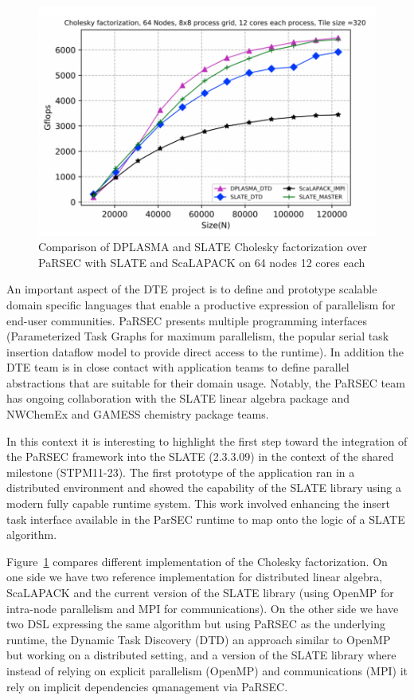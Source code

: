 \begin{figure}
\vspace*{-1em}\centering\includegraphics[scale=0.50]{projects/2.3.1-PMR/2.3.1.09-ParSEC/slate_updated_nacl.pdf}
  \caption{Comparison of DPLASMA and SLATE Cholesky factorization over PaRSEC with
           SLATE and ScaLAPACK on 64 nodes 12 cores each\label{fig:slate-parsec}}
\end{figure}
An important aspect of the DTE project is to define and prototype scalable
domain specific languages that enable a productive expression of parallelism for
end-user communities. PaRSEC presents multiple programming interfaces
(Parameterized Task Graphs for maximum parallelism, the popular serial task
insertion dataflow model to provide direct access to the runtime). In addition
the DTE team is in close contact with application teams to define parallel
abstractions that are suitable for their domain usage. Notably, the PaRSEC team
has ongoing collaboration with the SLATE linear algebra package and NWChemEx and
GAMESS chemistry package teams.

In this context it is interesting to highlight the first step toward
the integration of the PaRSEC framework into the SLATE (2.3.3.09) in
the context of the shared milestone (STPM11-23). The first prototype
of the application ran in a distributed environment and showed the
capability of the SLATE library using a modern fully capable runtime
system. This work involved enhancing the insert task interface
available in the ParSEC runtime to map onto the logic of a SLATE
algorithm.

Figure~\ref{fig:slate-parsec} compares different implementation of the
Cholesky factorization. On one side we have two reference
implementation for distributed linear algebra, ScaLAPACK and the
current version of the SLATE library (using OpenMP for intra-node
parallelism and MPI for communications). On the other side we have two
DSL expressing the same algorithm but using PaRSEC as the underlying
runtime, the Dynamic Task Discovery (DTD) an approach similar to
OpenMP but working on a distributed setting, and a version of the
SLATE library where instead of relying on explicit parallelism
(OpenMP) and communications (MPI) it rely on implicit dependencies
qmanagement via PaRSEC.


